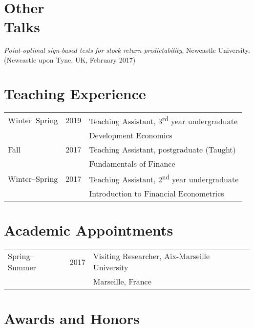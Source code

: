 \documentclass[margin,line,pifont,palatino,courier]{res}
\newcommand{\ts}{\textsuperscript}
\begin{document}
\begin{resume}
\hrulefill

\section{\sc \textbf{Other\\ Talks}}

\emph{Point-optimal sign-based tests for stock return predictability}, Newcastle University. (Newcastle upon Tyne, UK, February 2017)

\hrulefill

\section{\sc \textbf{Teaching Experience}}

\begin{tabular}{@{}p{1.3in}p{0.8in}p{4in}}
Winter--Spring & 2019 &Teaching Assistant, 3\ts{rd} year undergraduate\\
&&Development Economics\\
\rule{0pt}{4ex}Fall & 2017 & Teaching Assistant, postgraduate (Taught)\\
&& Fundamentals of Finance\\
\rule{0pt}{4ex}Winter--Spring & 2017 & Teaching Assistant, 2\ts{nd} year undergraduate \\
&&Introduction to Financial Econometrics
\end{tabular}

\hrulefill

\section{\sc \bf Academic Appointments}

\begin{tabular}{@{}p{1.3in}p{0.7in}p{4in}}
Spring--Summer & 2017 &Visiting Researcher, Aix-Marseille University\\
&&Marseille, France
\end{tabular}

\hrulefill

\section{\sc \bf Awards and Honors}


\end{resume}
\end{document}
